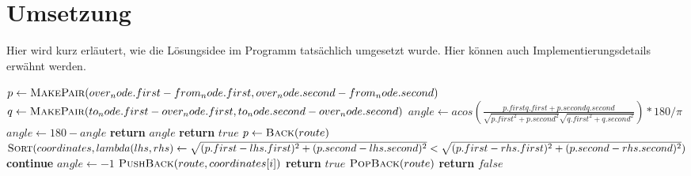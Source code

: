 \documentclass[a4paper,10pt,ngerman]{scrartcl}
\begin{document}
    \newpage


    \section{Umsetzung}\label{sec:umsetzung}
    Hier wird kurz erläutert, wie die Lösungsidee im Programm tatsächlich umgesetzt wurde.
    Hier können auch Implementierungsdetails erwähnt werden.

    \begin{algorithm}
        \begin{algorithmic}[1]
                \State $p \gets \Call{MakePair}{over_node.first-from_node.first,over_node.second-from_node.second}$
                \State $q \gets \Call{MakePair}{to_node.first-over_node.first,to_node.second-over_node.second}$
                \State $angle \gets acos(\frac{p.firstq.first+p.secondq.second}{\sqrt{p.first^2+p.second^2}\sqrt{q.first^2+q.second^2}})*180/\pi$
                    \State $angle \gets 180-angle$
                \EndIf
                \State \textbf{return} $angle$
            \EndFunction
            \State
                    \State \textbf{return} $true$
                \EndIf
                    \State $p \gets \Call{Back}{route}$
                    \State $\Call{Sort}{coordinates,lambda (lhs,rhs) \gets \sqrt{(p.first-lhs.first)^2+(p.second-lhs.second)^2}<\sqrt{(p.first-rhs.first)^2+(p.second-rhs.second)^2}}$
                \EndIf
                        \State \textbf{continue}
                    \EndIf
                    \State $angle \gets -1$
                    \EndIf
                        \State $\Call{PushBack}{route,coordinates[i]}$
                            \State \textbf{return} $true$
                        \Else
                            \State $\Call{PopBack}{route}$
                        \EndIf
                    \EndIf
                \EndFor
                \State \textbf{return} $false$
            \EndFunction
        \end{algorithmic}\label{alg:algorithm}
    \end{algorithm}
\end{document}
